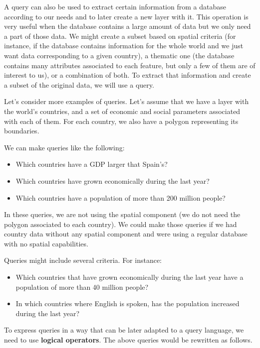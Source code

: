 A query can also be used to extract certain information from a database according to our needs and to later create a new layer with it. This operation is very useful when the database contains a large amount of data but we only need a part of those data. We might create a subset based on spatial criteria (for instance, if the database contains information for the whole world and we just want data corresponding to a given country), a thematic one (the database contains many attributes associated to each feature, but only a few of them are of interest to us), or a combination of both. To extract that information and create a subset of the original data, we will use a query.

Let's consider more examples of queries. Let's assume that we have a layer with the world's countries, and a set of economic and social parameters associated with each of them. For each country, we also have a polygon representing its boundaries.

We can make queries like the following:

\begin{itemize}
 \item Which countries have a GDP larger that Spain's?
\item Which countries have grown economically during the last year?
\item Which countries have a population of more than 200 million people? 
\end{itemize}

In these queries, we are not using the spatial component (we do not need the polygon associated to each country). We could make those queries if we had country data without any spatial component and were using a regular database with no spatial capabilities.

Queries might include several criteria. For instance:

\begin{itemize}
 \item Which countries that have grown economically during the last year have a population of more than 40 million people?
\item In which countries where English is spoken, has the population increased during the last year?
\end{itemize}

To express queries in a way that can be later adapted to a query language, we need to use \textbf{logical operators}. The above queries would be rewritten as follows.

